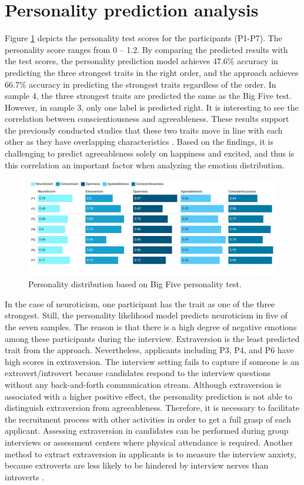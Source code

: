 \section{Personality prediction analysis}
Figure \ref{fig:personality_distribution} depicts the personality test scores for the participants (P1-P7). The personality score ranges from 0 -- 1.2. By comparing the predicted results with the test scores, the personality prediction model achieves 47.6\% accuracy in predicting the three strongest traits in the right order, and the approach achieves 66.7\% accuracy in predicting the strongest traits regardless of the order. In sample 4, the three strongest traits are predicted the same as the Big Five test. However, in sample 3, only one label is predicted right. It is interesting to see the correlation between conscientiousness and agreeableness. These results support the previously conducted studies that these two traits move in line with each other as they have overlapping characteristics \cite{big-five-john1999big}. Based on the findings, it is challenging to predict agreeableness solely on happiness and excited, and thus is this correlation an important factor when analyzing the emotion distribution. 
%
\begin{figure}[h]
  \centering
  \includegraphics[width=\textwidth]{figures/personality_dist_all.png}
  \caption{Personality distribution based on Big Five personality test.}
  \label{fig:personality_distribution}
\end{figure}
%
In the case of neuroticism, one participant has the trait as one of the three strongest. Still, the personality likelihood model predicts neuroticism in five of the seven samples. The reason is that there is a high degree of negative emotions among these participants during the interview. Extraversion is the least predicted trait from the approach. Nevertheless, applicants including P3, P4, and P6 have high scores in extraversion. The interview setting fails to capture if someone is an extrovert/introvert because candidates respond to the interview questions without any back-and-forth communication stream. Although extraversion is associated with a higher positive effect, the personality prediction is not able to distinguish extraversion from agreeableness. Therefore, it is necessary to facilitate the recruitment process with other activities in order to get a full grasp of each applicant. Assessing extraversion in candidates can be performed during group interviews or assessment centers where physical attendance is required. Another method to extract extraversion in applicants is to measure the interview anxiety, because extroverts are less likely to be hindered by interview nerves than introverts \cite{interview_nerves1_fletcher1990relationships}. 

